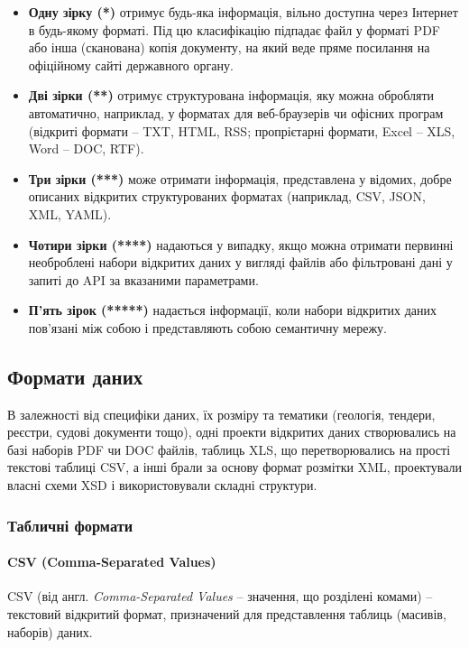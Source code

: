 \begin{itemize}
    \item \textbf{Одну зірку (*)} отримує будь-яка інформація, вільно доступна через Інтернет в будь-якому форматі. Під цю класифікацію підпадає файл у форматі PDF або інша (сканована) копія документу, на який веде пряме посилання на офіційному сайті державного органу.
    \item \textbf{Дві зірки (**)} отримує структурована інформація, яку можна обробляти автоматично, наприклад, у форматах для веб-браузерів чи офісних програм (відкриті формати – TXT, HTML, RSS; пропрієтарні формати, Excel – XLS, Word – DOC, RTF).
    \item \textbf{Три зірки (***)} може отримати інформація, представлена у відомих, добре описаних відкритих структурованих форматах (наприклад, CSV, JSON, XML, YAML).
    \item \textbf{Чотири зірки (****)} надаються у випадку, якщо можна отримати первинні необроблені набори відкритих даних у вигляді файлів або фільтровані дані у запиті до API за вказаними параметрами.
    \item \textbf{П’ять зірок (*****)} надається інформації, коли набори відкритих даних пов’язані між собою і представляють собою семантичну мережу.
\end{itemize}

\subsection{Формати даних}

В залежності від специфіки даних, їх розміру та тематики (геологія, тендери, реєстри, судові документи тощо), одні проекти відкритих даних створювались на базі наборів PDF чи DOC файлів, таблиць XLS, що перетворювались на прості текстові таблиці CSV, а інші брали за основу формат розмітки XML, проектували власні схеми XSD і використовували складні структури.

\subsubsection{Табличні формати}

\paragraph{CSV (Comma-Separated Values)}

CSV (від англ. \textit{Comma-Separated Values} – значення, що розділені комами) – текстовий відкритий формат, призначений для представлення таблиць (масивів, наборів) даних.

